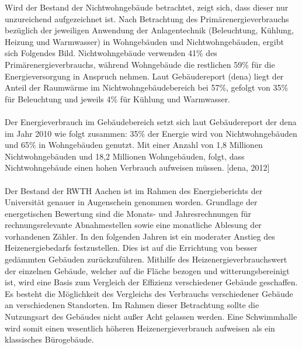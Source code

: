 Wird der Bestand der Nichtwohngebäude betrachtet, zeigt sich, dass dieser nur unzureichend aufgezeichnet ist. 
Nach Betrachtung des Primärenergieverbrauchs bezüglich der jeweiligen Anwendung der Anlagentechnik (Beleuchtung, Kühlung, Heizung und Warmwasser) in Wohngebäuden und Nichtwohngebäuden, ergibt sich Folgendes Bild. Nichtwohngebäude verwenden 41\% des Primärenergieverbrauchs, während Wohngebäude die restlichen 59\% für die Energieversorgung in Anspruch nehmen. Laut Gebäudereport (dena) liegt der Anteil der Raumwärme im Nichtwohngebäudebereich bei 57\%, gefolgt von 35\% für Beleuchtung und jeweils 4\% für Kühlung und Warmwasser.\\
\\
Der Energieverbrauch im Gebäudebereich setzt sich laut Gebäudereport der dena im Jahr 2010 wie folgt zusammen: 35\% der Energie wird von Nichtwohngebäuden und 65\% in Wohngebäuden genutzt. Mit einer Anzahl von 1,8 Millionen Nichtwohngebäuden und 18,2 Millionen Wohngebäuden, folgt, dass Nichtwohngebäude einen hohen Verbrauch aufweisen müssen. [dena, 2012]\\
\\
Der Bestand der RWTH Aachen ist im Rahmen des Energieberichts der Universität genauer in Augenschein genommen worden. 
Grundlage der energetischen Bewertung sind die Monats- und Jahresrechnungen für rechnungsrelevante Abnahmestellen sowie eine monatliche Ablesung der vorhandenen Zähler. In den folgenden Jahren ist ein moderater Anstieg des Heizenergiebedarfs festzustellen. Dies ist auf die Errichtung von besser gedämmten Gebäuden zurückzuführen. Mithilfe des Heizenergieverbrauchswert der einzelnen Gebäude, welcher auf die Fläche bezogen und witterungsbereinigt ist, wird eine Basis zum Vergleich der Effizienz verschiedener Gebäude geschaffen. Es besteht die Möglichkeit des Vergleichs des Verbrauchs verschiedener Gebäude an verschiedenen Standorten. Im Rahmen dieser Betrachtung sollte die Nutzungsart des Gebäudes nicht außer Acht gelassen werden. Eine Schwimmhalle wird somit einen wesentlich höheren Heizenergieverbrauch aufweisen als ein klassisches Bürogebäude. \\

